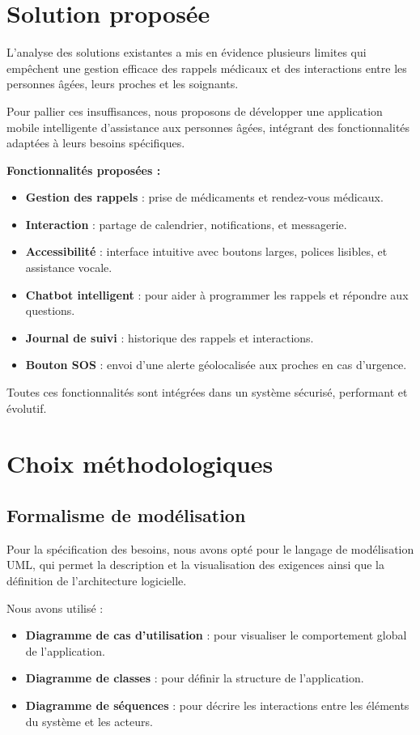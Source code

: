 \documentclass[12pt,a4paper]{report}
\begin{document}
\section{Solution proposée}

L’analyse des solutions existantes a mis en évidence plusieurs limites qui empêchent une gestion efficace des rappels médicaux et des interactions entre les personnes âgées, leurs proches et les soignants.

Pour pallier ces insuffisances, nous proposons de développer une application mobile intelligente d’assistance aux personnes âgées, intégrant des fonctionnalités adaptées à leurs besoins spécifiques.

\textbf{Fonctionnalités proposées :}
\begin{itemize}
    \item \textbf{Gestion des rappels} : prise de médicaments et rendez-vous médicaux.
    \item \textbf{Interaction} : partage de calendrier, notifications, et messagerie.
    \item \textbf{Accessibilité} : interface intuitive avec boutons larges, polices lisibles, et assistance vocale.
    \item \textbf{Chatbot intelligent} : pour aider à programmer les rappels et répondre aux questions.
    \item \textbf{Journal de suivi} : historique des rappels et interactions.
    \item \textbf{Bouton SOS} : envoi d’une alerte géolocalisée aux proches en cas d’urgence.
\end{itemize}

Toutes ces fonctionnalités sont intégrées dans un système sécurisé, performant et évolutif.

\section{Choix méthodologiques}

\subsection{Formalisme de modélisation}

Pour la spécification des besoins, nous avons opté pour le langage de modélisation UML, qui permet la description et la visualisation des exigences ainsi que la définition de l’architecture logicielle.

Nous avons utilisé :
\begin{itemize}
    \item \textbf{Diagramme de cas d’utilisation} : pour visualiser le comportement global de l’application.
    \item \textbf{Diagramme de classes} : pour définir la structure de l’application.
    \item \textbf{Diagramme de séquences} : pour décrire les interactions entre les éléments du système et les acteurs.
\end{itemize}
\end{document}
